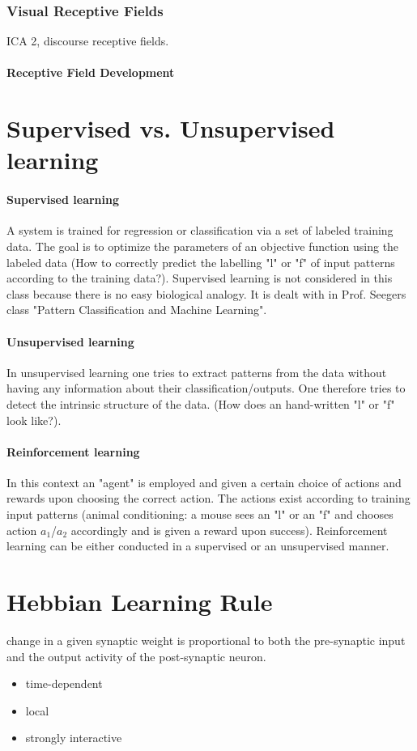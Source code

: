 \documentclass[11pt]{article}
\begin{document}
\subsubsection{Visual Receptive Fields}
ICA 2, discourse receptive fields. 

\paragraph{Receptive Field Development}


\section{Supervised vs. Unsupervised learning}
\paragraph{Supervised learning} A system is trained for regression or classification via a set of labeled training data. The goal is to optimize the parameters of an objective function using the labeled data (How to correctly predict the labelling "l" or "f" of input patterns according to the training data?). Supervised learning is not considered in this class because there is no easy biological analogy. It is dealt with in Prof. Seegers class "Pattern Classification and Machine Learning".
\paragraph{Unsupervised learning} In unsupervised learning one tries to extract patterns from the data without having any information about their classification/outputs. One therefore tries to detect the intrinsic structure of the data. (How does an hand-written "l" or "f" look like?). 
\paragraph{Reinforcement learning}
In this context an "agent" is employed and given a certain choice of actions and rewards upon choosing the correct action. The actions exist according to training input patterns (animal conditioning: a mouse sees an "l" or an "f" and chooses action $a_1$/$a_2$ accordingly and is given a reward upon success).
Reinforcement learning can be either conducted in a supervised or an unsupervised manner.

\section{Hebbian Learning Rule}
change in a given synaptic weight is proportional to both the pre-synaptic input and the output activity of the post-synaptic neuron.
\begin{itemize}
\item time-dependent
\item local
\item strongly interactive
\end{itemize}
\end{document}
